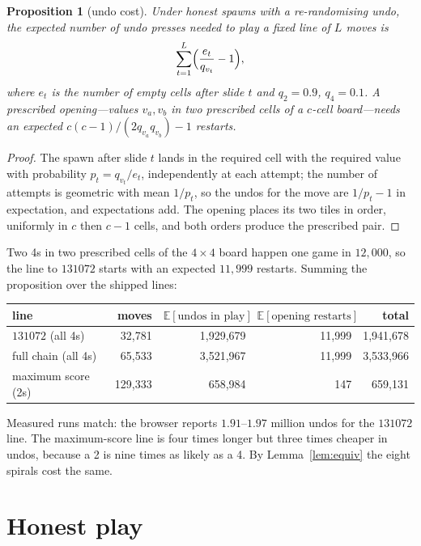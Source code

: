 \documentclass[11pt]{article}
\newtheorem{proposition}[theorem]{Proposition}
\theoremstyle{definition}
\theoremstyle{remark}
\begin{document}
\begin{proposition}[undo cost]\label{prop:undo}
Under honest spawns with a re-randomising undo, the expected number of
undo presses needed to play a fixed line of $L$ moves is
\[
\sum_{t=1}^{L}\Bigl(\frac{e_t}{q_{v_t}}-1\Bigr),
\]
where $e_t$ is the number of empty cells after slide $t$ and $q_2=0.9$,
$q_4=0.1$. A prescribed opening---values $v_a,v_b$ in two prescribed cells
of a $c$-cell board---needs an expected $c(c-1)/(2q_{v_a}q_{v_b})-1$
restarts.
\end{proposition}
\begin{proof}
The spawn after slide $t$ lands in the required cell with the required
value with probability $p_t=q_{v_t}/e_t$, independently at each attempt;
the number of attempts is geometric with mean $1/p_t$, so the undos for the
move are $1/p_t-1$ in expectation, and expectations add. The opening
places its two tiles in order, uniformly in $c$ then $c-1$ cells, and both
orders produce the prescribed pair.
\end{proof}

Two 4s in two prescribed cells of the $4\times4$ board happen one game in
$12{,}000$, so the line to $131072$ starts with an expected $11{,}999$
restarts. Summing the proposition over the shipped lines:

\begin{center}\small
\begin{tabular}{@{}lrrrr@{}}
\toprule
line & moves & $\mathbb E[\text{undos in play}]$ & $\mathbb E[\text{opening restarts}]$ & total \\
\midrule
$131072$ (all 4s) & 32{,}781 & 1{,}929{,}679 & 11{,}999 & 1{,}941{,}678 \\
full chain (all 4s) & 65{,}533 & 3{,}521{,}967 & 11{,}999 & 3{,}533{,}966 \\
maximum score (2s) & 129{,}333 & 658{,}984 & 147 & 659{,}131 \\
\bottomrule
\end{tabular}
\end{center}

Measured runs match: the browser reports $1.91$--$1.97$ million undos for
the $131072$ line. The maximum-score line is four times longer but three
times cheaper in undos, because a 2 is nine times as likely as a 4. By
Lemma~\ref{lem:equiv} the eight spirals cost the same.

\section{Honest play}\label{sec:honest}
\end{document}
